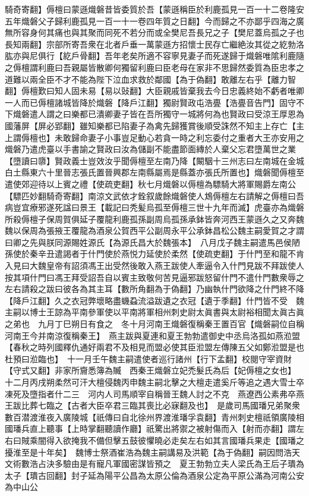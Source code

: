 騎奇寄翻】傉檀曰蒙遜熾磐昔皆委質於吾【蒙遜稱臣於利鹿孤見一百一十二卷隆安五年熾磐父子歸利鹿孤見一百一十一卷四年質之日翻】今而歸之不亦鄙乎四海之廣無所容身何其痛也與其聚而同死不若分而或全樊尼吾長兄之子【樊尼蓋烏孤之子也長知兩翻】宗部所寄吾衆在北者戶垂一萬蒙遜方招懷士民存亡繼絶汝其從之紇勃洛肱亦與尼俱行【紇戶骨翻】吾年老矣所適不容寧見妻子而死遂歸于熾磐唯隂利鹿隨之傉檀謂利鹿曰吾親屬皆散卿何獨留利鹿曰臣老母在家非不思歸然委質為臣忠孝之道難以兩全臣不才不能為陛下泣血求救於鄰國【為于偽翻】敢離左右乎【離力智翻】傉檀歎曰知人固未易【易以䜴翻】大臣親戚皆棄我去今日忠義終始不虧者唯卿一人而已傉檀諸城皆降於熾磐【降戶江翻】獨尉賢政屯浩亹【浩亹音告門】固守不下熾磐遣人謂之曰樂都已潰卿妻子皆在吾所獨守一城將何為也賢政曰受涼王厚恩為國藩屏【屏必郢翻】雖知樂都已陷妻子為禽先歸獲賞後順受誅然不知主上存亡【主上謂傉檀也】未敢歸命妻子小事豈足動心若貪一時之利忘委付之重者大王亦安用之熾磐乃遣虎臺以手書諭之賢政曰汝為儲副不能盡節面縳於人棄父忘君墮萬世之業【墮讀曰隳】賢政義士豈效汝乎聞傉檀至左南乃降【闞駰十三州志曰左南城在金城白土縣東六十里晉志張氏置晉興郡左南縣屬焉是縣蓋亦張氏所置也】熾磐聞傉檀至遣使郊迎待以上賓之禮【使疏吏翻】秋七月熾磐以傉檀為驃騎大將軍賜爵左南公【驃匹妙翻騎奇寄翻】南涼文武依才銓叙歲餘熾磐使人鴆傉檀左右請解之傉檀曰吾病豈宜療邪遂死諡曰景王【載記曰秃髪烏孤至傉檀三世十九年而滅】虎臺亦為熾磐所殺傉檀子保周賀俱延子覆龍利鹿孤孫副周烏孤孫承鉢皆奔河西王蒙遜久之又奔魏魏以保周為張掖王覆龍為酒泉公賀西平公副周永平公承鉢昌松公魏主嗣愛賀之才謂曰卿之先與朕同源賜姓源氏【為源氏昌大於魏張本】　八月戊子魏主嗣遣馬邑侯陋孫使於秦辛丑遣謁者于什門使於燕悦力延使於柔然【使疏吏翻】于什門至和龍不肯入見曰大魏皇帝有詔須馮王出受然後敢入燕王跋使人牽逼令入什門見跋不拜跋使人按其項什門曰馮王拜受詔吾自以賓主致敬何苦見逼邪跋怒留什門不遣什門數衆辱之左右請殺之跋曰彼各為其主耳【數所角翻為于偽翻】乃幽執什門欲降之什門終不降【降戶江翻】久之衣冠弊壞略盡蟣蝨流溢跋遺之衣冠【遺于季翻】什門皆不受　魏主嗣以博士王諒為平南參軍使以平南將軍相州刺史尉太眞書與太尉裕相聞太眞古眞之弟也　九月丁巳朔日有食之　冬十月河南王熾磐復稱秦王置百官【熾磐嗣位自稱河南王今并南涼復稱秦王】　燕主跋與夏連和夏王勃勃遣御史中丞烏洛孤如燕涖盟【春秋之時列國釋仇通好兩君不及相見而盟必使其臣涖盟左傳陳五父如鄭涖盟是也杜預曰涖臨也】　十一月壬午魏主嗣遣使者巡行諸州【行下孟翻】校閱守宰資財【守式又翻】非家所齎悉簿為贓　西秦王熾磐立妃禿髮氏為后【妃傉檀之女也】　十二月丙戌朔柔然可汗大檀侵魏丙申魏主嗣北擊之大檀走遣奚斤等追之遇大雪士卒凍死及墮指者什二三　河内人司馬順宰自稱晉王魏人討之不克　燕遼西公素弗卒燕王跋比葬七臨之【古者大臣卒君三臨其喪比必寐翻及也】　是歲司馬國璠兄弟聚衆數百潜渡淮夜入廣陵城【祇傳曰自北徐州界渡淮璠孚袁翻】青州刺史檀祇領廣陵相國璠兵直上聽事【上時掌翻聽讀作廳】祇驚出將禦之被射傷而入【射而亦翻】謂左右曰賊乘闇得入欲掩我不備但擊五鼓彼懼曉必走矣左右如其言國璠兵果走【國璠之擾淮至是十年矣】　魏博士祭酒崔浩為魏主嗣講易及洪範【為于偽翻】嗣因問浩天文術數浩占決多驗由是有寵凡軍國密謀皆預之　夏王勃勃立夫人梁氏為王后子璝為太子【璝古回翻】封子延為陽平公昌為太原公倫為酒泉公定為平原公滿為河南公安為中山公

